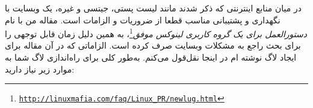 در میان منابع اینترنتی که ذکر شدند مانند لیست پستی، جیتسی و غیره، یک وبسایت
با نگهداری و پشتیبانی مناسب قطعا از ضروریات و الزامات است. مقاله من با نام
\emph{دستورالعمل برای یک گروه کاربری لینوکس موفق}\footnote{\texttt{\url{http://linuxmafia.com/faq/Linux_PR/newlug.html}}}،
به همین دلیل زمان قابل توجهی را برای بحث راجع به مشکلات وبسایت صرف کرده است.
الزاماتی که در آن مقاله برای ایجاد لاگ نوشته ام در اینجا نقل‌قول می‌کنم.
به‌طور کلی برای راه‌اندازی لاگ شما به موارد زیر نیاز دارید:


